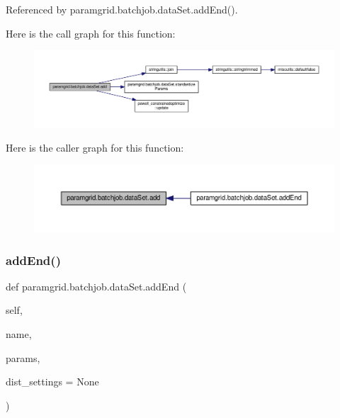 Referenced by paramgrid.\+batchjob.\+data\+Set.\+add\+End().

Here is the call graph for this function\+:
\nopagebreak
\begin{figure}[H]
\begin{center}
\leavevmode
\includegraphics[width=350pt]{classparamgrid_1_1batchjob_1_1dataSet_aaf45e016ba6fb5889f4df3c6993b017a_cgraph}
\end{center}
\end{figure}
Here is the caller graph for this function\+:
\nopagebreak
\begin{figure}[H]
\begin{center}
\leavevmode
\includegraphics[width=350pt]{classparamgrid_1_1batchjob_1_1dataSet_aaf45e016ba6fb5889f4df3c6993b017a_icgraph}
\end{center}
\end{figure}
\mbox{\label{classparamgrid_1_1batchjob_1_1dataSet_a2456e07b3b60221a0cf3d9d678ad9e1d}} 
\subsubsection{\texorpdfstring{add\+End()}{addEnd()}}
{\footnotesize\ttfamily def paramgrid.\+batchjob.\+data\+Set.\+add\+End (\begin{DoxyParamCaption}\item[{}]{self,  }\item[{}]{name,  }\item[{}]{params,  }\item[{}]{dist\+\_\+settings = {\ttfamily None} }\end{DoxyParamCaption})}



